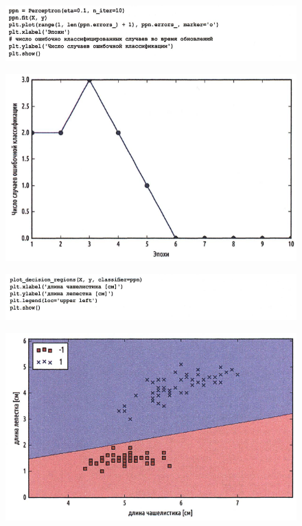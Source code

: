 \documentclass{beamer}
\begin{document}
\begin{frame}[t]
\begin{figure}[h]
\centering
\includegraphics[scale=0.5]{images/lec03-pic15.png}
\end{figure}
\begin{figure}[h]
\centering
\includegraphics[scale=0.5]{images/lec03-pic16.png}
\end{figure}
\end{frame}

\begin{frame}[t]
\begin{figure}[h]
\centering
\includegraphics[scale=0.5]{images/lec03-pic17.png}
\end{figure}
\begin{figure}[h]
\centering
\includegraphics[scale=0.5]{images/lec03-pic18.png}
\end{figure}
\end{frame}
\end{document}
